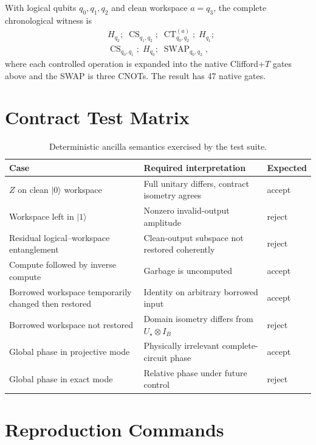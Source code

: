 With logical qubits $q_0,q_1,q_2$ and clean workspace $a=q_3$, the complete chronological witness is
\begin{equation}
\begin{aligned}
&H_{q_2};\;\operatorname{CS}_{q_1,q_2};\;
\operatorname{CT}_{q_0,q_2}^{(a)};\;H_{q_1};\\
&\operatorname{CS}_{q_0,q_1};\;H_{q_0};\;
\operatorname{SWAP}_{q_0,q_2},
\end{aligned}
\end{equation}
where each controlled operation is expanded into the native Clifford+$T$ gates above and the SWAP is three CNOTs. The result has 47 native gates.

\section{Contract Test Matrix}

\begin{table}[h]
\caption{Deterministic ancilla semantics exercised by the test suite.}
\centering
\begin{tabularx}{\textwidth}{lXl}
\toprule
Case & Required interpretation & Expected\\
\midrule
$Z$ on clean $\lvert0\rangle$ workspace & Full unitary differs, contract isometry agrees & accept\\
Workspace left in $\lvert1\rangle$ & Nonzero invalid-output amplitude & reject\\
Residual logical--workspace entanglement & Clean-output subspace not restored coherently & reject\\
Compute followed by inverse compute & Garbage is uncomputed & accept\\
Borrowed workspace temporarily changed then restored & Identity on arbitrary borrowed input & accept\\
Borrowed workspace not restored & Domain isometry differs from $U_\star\otimes I_B$ & reject\\
Global phase in projective mode & Physically irrelevant complete-circuit phase & accept\\
Global phase in exact mode & Relative phase under future control & reject\\
\bottomrule
\end{tabularx}
\end{table}

\section{Reproduction Commands}

